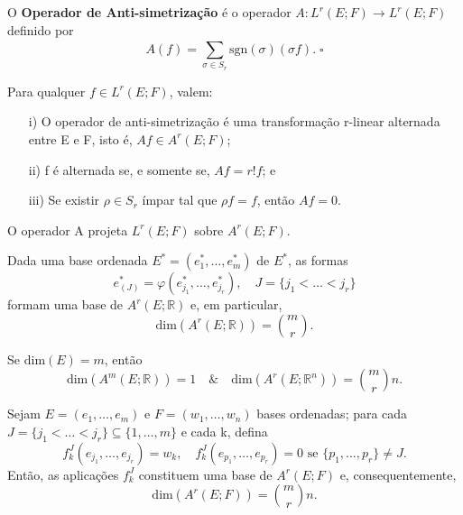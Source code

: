 \documentclass[../differential_forms.tex]{subfiles}
\begin{document}
\begin{def*}
	O \textbf{Operador de Anti-simetrização} é o operador \(A:L^{r}(E; F)\rightarrow L^{r}(E; F)\) definido por
	\[
		A(f)= \sum\limits_{\sigma \in S_r}^{} \mathrm{sgn}(\sigma )(\sigma f). \; \square
	\]
\end{def*}
\begin{prop*}
	Para qualquer \(f\in L^{r}(E; F)\), valem:
	\begin{itemize}
		\item[i)] O operador de anti-simetrização é uma transformação r-linear alternada entre E e F, isto é, \(Af\in A^{r}(E; F)\);
		\item[ii)] f é alternada se, e somente se, \(Af=r!f\); e
		\item[iii)] Se existir \(\rho \in S_r\) ímpar tal que \(\rho f = f\), então \(Af=0\).
	\end{itemize}
\end{prop*}
\begin{crl*}
	O operador A projeta \(L^{r}(E; F)\) sobre \(A^{r}(E; F)\).
\end{crl*}
\begin{prop*}
	Dada uma base ordenada \(E^{*}=(e_{1}^{*}, \dotsc , e_{m}^{*})\) de \(E^{*}\), as formas
	\[
		e_{(J)}^{*}=\varphi (e_{j_1}^{*}, \dotsc , e_{j_r}^{*}), \quad J = \{j_1<\dotsc <j_r\}
	\]
	formam uma base de \(A^{r}(E; \mathbb{R})\) e, em particular,
	\[
		\mathrm{dim}(A^{r}(E; \mathbb{R}))= \binom{m}{r}.
	\]
\end{prop*}
\begin{crl*}
	Se \(\mathrm{dim}(E) = m\), então
	\[
		\mathrm{dim}(A^{m}(E; \mathbb{R}))=1 \quad\&\quad \mathrm{dim}(A^{r}(E; \mathbb{R}^{n}))= \binom{m}{r}n.
	\]
\end{crl*}
\begin{prop*}
	Sejam \(E=(e_1,\dotsc ,e_{m})\) e \(F=(w_1,\dotsc ,w_{n})\) bases ordenadas; para cada \(J=\{j_1<\dotsc <j_r\}\subseteq \{1,\dotsc ,m\}\) e cada k, defina
	\[
		f_{k}^{J}(e_{j_1}, \dotsc , e_{j_r}) = w_{k}, \quad f_{k}^{J}(e_{p_1}, \dotsc , e_{p_r})=0 \text{ se }\{p_1,\dotsc , p_r\}\neq J.
	\]
	Então, as aplicações \(f_{k}^{J}\) constituem uma base de \(A^{r}(E; F)\) e, consequentemente,
	\[
		\mathrm{dim}(A^{r}(E; F))=\binom{m}{r}n.
	\]
\end{prop*}
\end{document}
